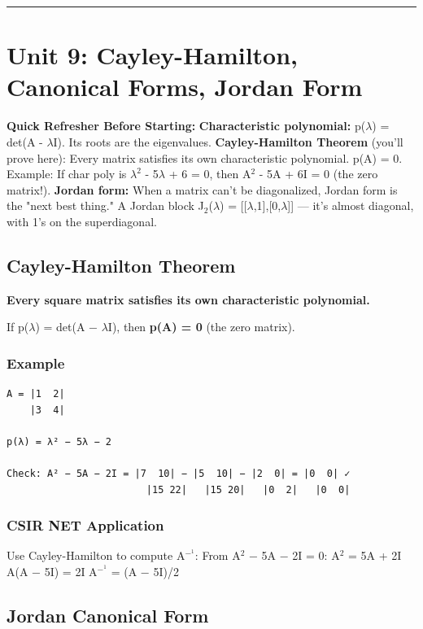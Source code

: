 \documentclass[12pt,a4paper,openany]{book}
\begin{document}
{{\bigskip\noindent\rule{\textwidth}{0.4pt}\bigskip

\section{Unit 9: Cayley-Hamilton, Canonical Forms, Jordan Form }

\begin{prereqbox}
 \textbf{Quick Refresher Before Starting:}
\textbf{Characteristic polynomial:} p($\lambda$) = det(A - $\lambda$I). Its roots are the eigenvalues.
\textbf{Cayley-Hamilton Theorem} (you'll prove here): Every matrix satisfies its own characteristic polynomial. p(A) = 0.
Example: If char poly is $\lambda^2$ - 5$\lambda$ + 6 = 0, then A$^2$ - 5A + 6I = 0 (the zero matrix!).
\textbf{Jordan form:} When a matrix can't be diagonalized, Jordan form is the "next best thing."
A Jordan block J$_2$($\lambda$) = [[$\lambda$,1],[0,$\lambda$]] — it's almost diagonal, with 1's on the superdiagonal.
\end{prereqbox}


\subsection{Cayley-Hamilton Theorem}

\textbf{Every square matrix satisfies its own characteristic polynomial.}

If p($\lambda$) = det(A − $\lambda$I), then \textbf{p(A) = 0} (the zero matrix).

\subsubsection{Example}
\begin{verbatim}
A = |1  2|
    |3  4|

p(λ) = λ² − 5λ − 2

Check: A² − 5A − 2I = |7  10| − |5  10| − |2  0| = |0  0| ✓
                        |15 22|   |15 20|   |0  2|   |0  0|
\end{verbatim}

\subsubsection{ CSIR NET Application}
Use Cayley-Hamilton to compute A$^{-}^1$:
From A$^2$ − 5A − 2I = 0: A$^2$ = 5A + 2I  A(A − 5I) = 2I  A$^{-}^1$ = (A − 5I)/2

\subsection{Jordan Canonical Form}

}}
\end{document}
